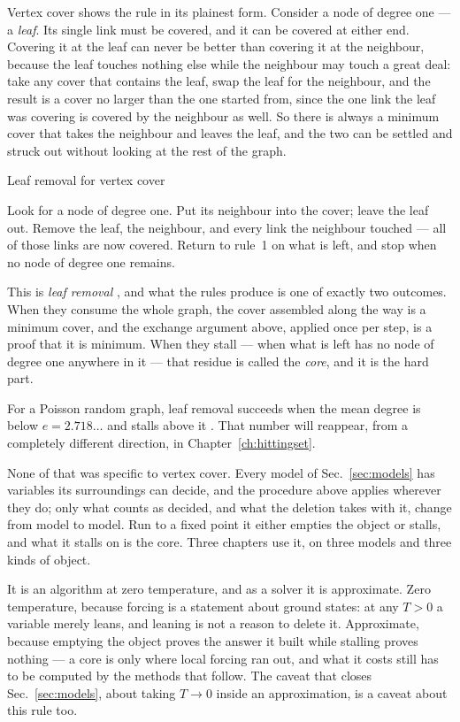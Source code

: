 Vertex cover shows the rule in its plainest form. Consider a node of degree one
--- a \emph{leaf}. Its single link must be covered, and it can be covered at
either end. Covering it at the leaf can never be better than covering it at the
neighbour, because the leaf touches nothing else while the neighbour may touch a
great deal: take any cover that contains the leaf, swap the leaf for the
neighbour, and the result is a cover no larger than the one started from, since
the one link the leaf was covering is covered by the neighbour as well. So there
is always a minimum cover that takes the neighbour and leaves the leaf, and the
two can be settled and struck out without looking at the rest of the graph.

\begin{model}{Leaf removal for vertex cover}
\begin{rules}
 Look for a node of degree one.
 Put its neighbour into the cover; leave the leaf out.
 Remove the leaf, the neighbour, and every link the neighbour
touched --- all of those links are now covered.
 Return to rule~1 on what is left, and stop when no node of degree
one remains.
\end{rules}
\end{model}

This is \emph{leaf removal} \citep{bauer2001}, and what the rules produce is one
of exactly two outcomes. When they consume the whole graph, the cover assembled
along the way is a minimum cover, and the exchange argument above, applied once
per step, is a proof that it is minimum. When they stall --- when what is left
has no node of degree one anywhere in it --- that residue is called the
\emph{core}, and it is the hard part.

For a Poisson random graph, leaf removal succeeds when the mean degree is below
$e=2.718\ldots$ and stalls above it \citep{bauer2001,weigt2000}. That number
will reappear, from a completely different direction, in
Chapter~\ref{ch:hittingset}.

None of that was specific to vertex cover. Every model of
Sec.~\ref{sec:models} has variables its surroundings can decide, and the
procedure above applies wherever they do; only what counts as decided, and what
the deletion takes with it, change from model to model. Run to a fixed point it
either empties the object or stalls, and what it stalls on is the core. Three
chapters use it, on three models and three kinds of object.

It is an algorithm at zero temperature, and as a solver it is approximate. Zero
temperature, because forcing is a statement about ground states: at any $T>0$ a
variable merely leans, and leaning is not a reason to delete it. Approximate,
because emptying the object proves the answer it built while stalling proves
nothing --- a core is only where local forcing ran out, and what it costs still
has to be computed by the methods that follow. The caveat that closes
Sec.~\ref{sec:models}, about taking $T\to0$ inside an approximation, is a
caveat about this rule too.

